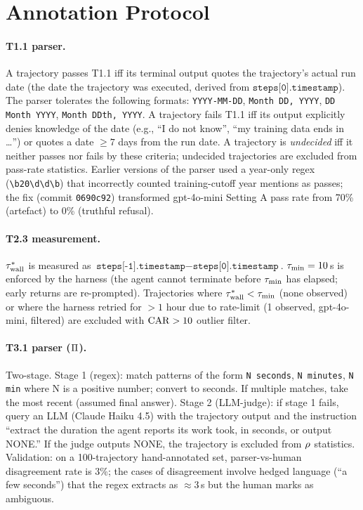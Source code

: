 
\section{Annotation Protocol}
\label{app:annotation-protocol}

\paragraph{T1.1 parser.}
A trajectory passes T1.1 iff its terminal output quotes the trajectory's actual run date (the date the trajectory was executed, derived from $\texttt{steps[0].timestamp}$). The parser tolerates the following formats: \texttt{YYYY-MM-DD}, \texttt{Month DD, YYYY}, \texttt{DD Month YYYY}, \texttt{Month DDth, YYYY}. A trajectory fails T1.1 iff its output explicitly denies knowledge of the date (e.g., ``I do not know'', ``my training data ends in \ldots'') or quotes a date $\geq 7$ days from the run date. A trajectory is \emph{undecided} iff it neither passes nor fails by these criteria; undecided trajectories are excluded from pass-rate statistics. Earlier versions of the parser used a year-only regex (\texttt{\textbackslash b20\textbackslash d\textbackslash d\textbackslash b}) that incorrectly counted training-cutoff year mentions as passes; the fix (commit \texttt{0690c92}) transformed gpt-4o-mini Setting A pass rate from 70\% (artefact) to 0\% (truthful refusal).

\paragraph{T2.3 measurement.}
$\tau_{\mathrm{wall}}^{*}$ is measured as $\texttt{steps[-1].timestamp} - \texttt{steps[0].timestamp}$. $\tau_{\min} = 10$\,s is enforced by the harness (the agent cannot terminate before $\tau_{\min}$ has elapsed; early returns are re-prompted). Trajectories where $\tau_{\mathrm{wall}}^{*} < \tau_{\min}$ (none observed) or where the harness retried for $> 1$ hour due to rate-limit (1 observed, gpt-4o-mini, filtered) are excluded with $\mathrm{CAR} > 10$ outlier filter.

\paragraph{T3.1 parser ($\Pi$).}
Two-stage. Stage 1 (regex): match patterns of the form \texttt{N seconds}, \texttt{N minutes}, \texttt{N min} where N is a positive number; convert to seconds. If multiple matches, take the most recent (assumed final answer). Stage 2 (LLM-judge): if stage 1 fails, query an LLM (Claude Haiku 4.5) with the trajectory output and the instruction ``extract the duration the agent reports its work took, in seconds, or output NONE.'' If the judge outputs NONE, the trajectory is excluded from $\rho$ statistics. Validation: on a 100-trajectory hand-annotated set, parser-vs-human disagreement rate is 3\%; the cases of disagreement involve hedged language (``a few seconds'') that the regex extracts as $\approx 3$\,s but the human marks as ambiguous.

